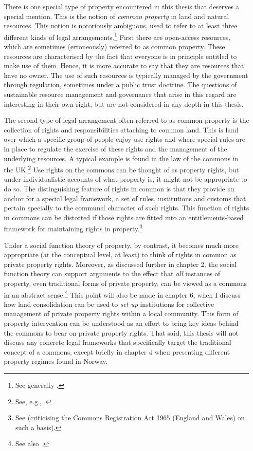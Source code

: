 {There is one special type of property encountered in this thesis that deserves a special mention. This is the notion of {\it common property} in land and natural resources. This notion is notoriously ambiguous, used to refer to at least three different kinds of legal arrangements.\footnote{See generally \cite{fennel11}.} First there are open-access resources, which are sometimes (erroneously) referred to as common property. These resources are characterised by the fact that everyone is in principle entitled to make use of them. Hence, it is more accurate to say that they are resources that have no owner. The use of such resources is typically managed by the government through regulation, sometimes under a public trust doctrine. The questions of sustainable resource management and governance that arise in this regard are interesting in their own right, but are not considered in any depth in this thesis.

The second type of legal arrangement often referred to as common property is the collection of rights and responsibilities attaching to common land. This is land over which a specific group of people enjoy use rights and where special rules are in place to regulate the exercise of these rights and the management of the underlying resources. A typical example is found in the law of the commons in the UK.\footnote{See, e.g., \cite{rodgers11}.} Use rights on the commons can be thought of as property rights, but under individualistic accounts of what property is, it might not be appropriate to do so. The distinguishing feature of rights in common is that they provide an anchor for a special legal framework, a set of rules, institutions and customs that pertain specially to the communal character of such rights. This function of rights in commons can be distorted if those rights are fitted into an entitlements-based framework for maintaining rights in property.\footnote{See \cite{rodgers11} (criticising the Commons Registration Act 1965 (England and Wales) on such a basis).} 

Under a social function theory of property, by contrast, it becomes much more appropriate (at the conceptual level, at least) to think of rights in common as private property rights. Moreover, as discussed further in chapter 2, the social function theory can support arguments to the effect that {\it all} instances of property, even traditional forms of private property, can be viewed as a commons in an abstract sense.\footnote{See also \cite{fennel11}.} This point will also be made in chapter 6, when I discuss how land consolidation can be used to {\it set up} institutions for collective management of private property rights within a local community. This form of property intervention can be understood as an effort to bring key ideas behind the commons to bear on private property rights. That said, this thesis will not discuss any concrete legal frameworks that specifically target the traditional concept of a commons, except briefly in chapter 4 when presenting different property regimes found in Norway.

}
